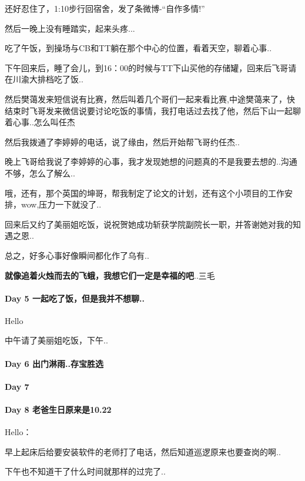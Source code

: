 \documentclass[UTF8,a4paper,8pt]{ctexbook}
\begin{document}
	 	 还好忍住了，1:10步行回宿舍，发了条微博-“自作多情!”
	 	 
	 	 然后一晚上没有睡踏实，起来头疼...
	 	 
	 	 吃了午饭，到操场与CB和TT躺在那个中心的位置，看着天空，聊着心事..
	 	 
	 	 下午回来后，睡了会儿，到16：00的时候与TT下山买他的存储罐，回来后飞哥请在川渝大排档吃了饭..
	 	 
	 	 然后樊蔼发来短信说有比赛，然后叫着几个哥们一起来看比赛,中途樊蔼来了，快结束时飞哥发来微信说要讨论吃饭的事情，我打电话过去找了他，然后下山一起聊着心事..怎么叫任杰
	 	 
	 	 然后我拨通了李婷婷的电话，说了缘由，然后开始帮飞哥约任杰..
	 	 
	 	 晚上飞哥给我说了李婷婷的心事，我才发现她想的问题真的不是我要去想的..沟通不够，怎么了解么..
	 	 
	 	 哦，还有，那个英国的坤哥，帮我制定了论文的计划，还有这个小项目的工作安排，wow,压力一下就没了..
	 	 
	 	 回来后又约了美丽姐吃饭，说祝贺她成功斩获学院副院长一职，并答谢她对我的知遇之恩..
	 	 
	 	 总之，好多心事好像瞬间都化作了乌有..
	 	 
	 	 \textbf{就像追着火烛而去的飞蛾，我想它们一定是幸福的吧}..三毛
	 	 
 	 \paragraph{Day 5   一起吃了饭，但是我并不想聊..    \quad     }	
	 	 Hello 
	 	 
	 	 中午请了美丽姐吃饭，下午..
	 	 
 	 \paragraph{Day 6   出门淋雨..存宝胜选    \quad     }
 	 \paragraph{Day 7       \quad     }
 	 \paragraph{Day 8   老爸生日原来是10.22    \quad     }
	 	 Hello： 
	 	 
	 	 早上起床后给要安装软件的老师打了电话，然后知道巡逻原来也要查岗的啊..
	 	 
	 	 下午也不知道干了什么时间就那样的过完了..
	 	 
\end{document}
